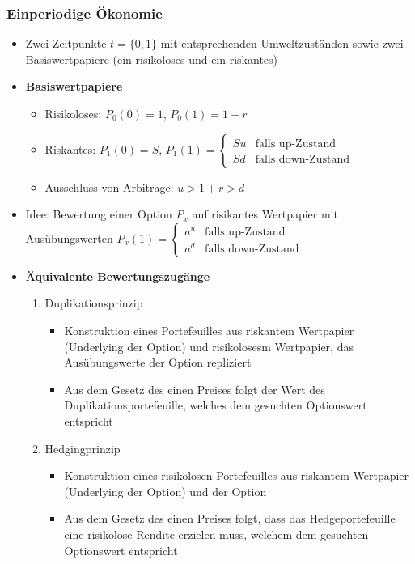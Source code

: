 \subsubsection{Einperiodige Ökonomie}
\begin{itemize}
	\item Zwei Zeitpunkte \(t=\{0,1\}\) mit entsprechenden Umweltzuständen sowie zwei Basiswertpapiere (ein risikoloses und ein riskantes)
	\item \textbf{Basiswertpapiere}
	\begin{itemize}
		\item Risikoloses: \(P_0(0)=1\), \(P_0(1)=1+r\)
		\item Riskantes: \(P_1(0)=S\), \(P_1(1)=\begin{cases}Su& \text{falls up-Zustand} \\Sd&\text{falls down-Zustand}\end{cases}\)
		\item Ausschluss von Arbitrage: \(u>1+r>d\)
	\end{itemize}
	\item Idee: Bewertung einer Option \(P_x\) auf risikantes Wertpapier mit Ausübungswerten \(P_x(1)=\begin{cases}a^u& \text{falls up-Zustand} \\a^d&\text{falls down-Zustand}\end{cases}\)
	\item \textbf{Äquivalente Bewertungszugänge}
	\begin{enumerate}
		\item Duplikationsprinzip
		\begin{itemize}
			\item Konstruktion eines Portefeuilles aus riskantem Wertpapier (Underlying der Option) und risikolosesm Wertpapier, das Ausübungswerte der Option repliziert
			\item Aus dem Gesetz des einen Preises folgt der Wert des Duplikationsportefeuille, welches dem gesuchten Optionswert entspricht
		\end{itemize}
		\item Hedgingprinzip
		\begin{itemize}
			\item Konstruktion eines risikolosen Portefeuilles aus riskantem Wertpapier (Underlying der Option) und der Option
			\item Aus dem Gesetz des einen Preises folgt, dass das Hedgeportefeuille eine risikolose Rendite erzielen muss, welchem dem gesuchten Optionswert entspricht

\end{itemize}
\end{enumerate}
\end{itemize}
